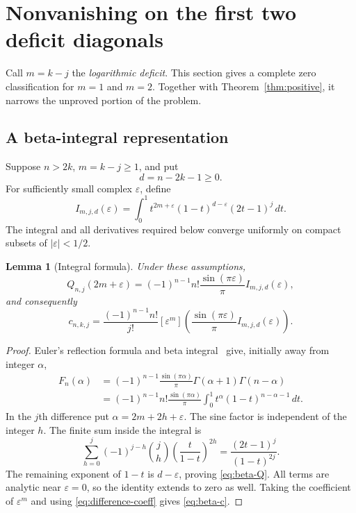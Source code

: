 \documentclass[11pt]{article}
\numberwithin{equation}{section}
\newtheorem{lemma}[theorem]{Lemma}
\theoremstyle{definition}
\theoremstyle{remark}
\begin{document}
\section{Nonvanishing on the first two deficit diagonals}\label{sec:small-m}
Call $m=k-j$ the \emph{logarithmic deficit}. This section gives a complete
zero classification for $m=1$ and $m=2$. Together with
Theorem~\ref{thm:positive}, it narrows the unproved portion of the problem.

\subsection{A beta-integral representation}
Suppose $n>2k$, $m=k-j\ge1$, and put
\begin{equation}\label{eq:d}
 d=n-2k-1\ge0.
\end{equation}
For sufficiently small complex $\varepsilon$, define
\begin{equation}\label{eq:I}
 I_{m,j,d}(\varepsilon)=
 \int_0^1 t^{2m+\varepsilon}(1-t)^{d-\varepsilon}(2t-1)^j\,dt.
\end{equation}
The integral and all derivatives required below converge uniformly on
compact subsets of $|\varepsilon|<1/2$.

\begin{lemma}[Integral formula]\label{lem:beta}
Under these assumptions,
\begin{equation}\label{eq:beta-Q}
 Q_{n,j}(2m+\varepsilon)
 =(-1)^{n-1}n!\frac{\sin(\pi\varepsilon)}{\pi}
    I_{m,j,d}(\varepsilon),
\end{equation}
and consequently
\begin{equation}\label{eq:beta-c}
 c_{n,k,j}=\frac{(-1)^{n-1}n!}{j!}
 [\varepsilon^m]\left(
 \frac{\sin(\pi\varepsilon)}{\pi}I_{m,j,d}(\varepsilon)\right).
\end{equation}
\end{lemma}
\begin{proof}
Euler's reflection formula and beta integral~\cite{dlmf-reflection,dlmf-beta}
give, initially away from integer $\alpha$,
\begin{align*}
 F_n(\alpha)
 &=(-1)^{n-1}\frac{\sin(\pi\alpha)}{\pi}
      \Gamma(\alpha+1)\Gamma(n-\alpha)\\
 &=(-1)^{n-1}n!\frac{\sin(\pi\alpha)}{\pi}
      \int_0^1t^\alpha(1-t)^{n-\alpha-1}\,dt.
\end{align*}
In the $j$th difference put $\alpha=2m+2h+\varepsilon$. The sine factor
is independent of the integer $h$. The finite sum inside the integral is
\[
 \sum_{h=0}^j(-1)^{j-h}\binom jh
     \left(\frac{t}{1-t}\right)^{2h}
 =\frac{(2t-1)^j}{(1-t)^{2j}}.
\]
The remaining exponent of $1-t$ is $d-\varepsilon$, proving
\eqref{eq:beta-Q}. All terms are analytic near $\varepsilon=0$, so the
identity extends to zero as well. Taking the coefficient of
$\varepsilon^m$ and using \eqref{eq:difference-coeff} gives
\eqref{eq:beta-c}.
\end{proof}
\end{document}
